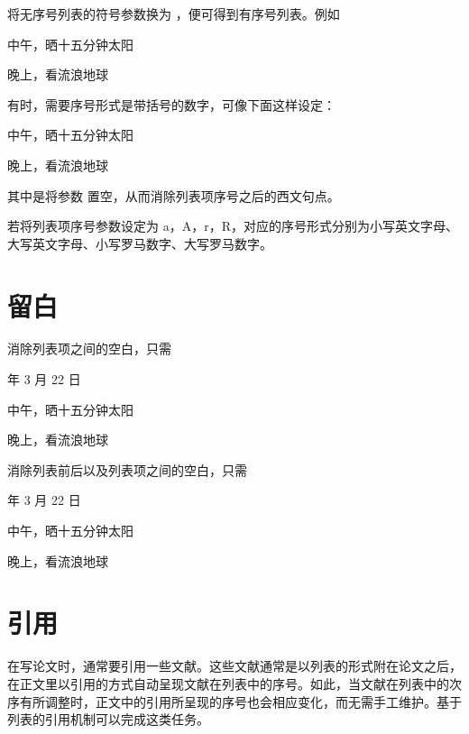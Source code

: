 将无序号列表的符号参数换为 ，便可得到有序号列表。例如

\startexample
\startitemize[n]
\item 中午，晒十五分钟太阳
\item 晚上，看流浪地球 
\stopitemize
\stopexample
{}

有时，需要序号形式是带括号的数字，可像下面这样设定：

\startexample
\startitemize[n][left=(,right=),stopper=]
\item 中午，晒十五分钟太阳
\item 晚上，看流浪地球 
\stopitemize
\stopexample
{}

\noindent 其中是将参数  置空，从而消除列表项序号之后的西文句点。

若将列表项序号参数设定为 a，A，r，R，对应的序号形式分别为小写英文字母、大写英文字母、小写罗马数字、大写罗马数字。

\section{留白}

消除列表项之间的空白，只需

 年 3 月 22 日
\startitemize[1,packed]
\item 中午，晒十五分钟太阳
\item 晚上，看流浪地球 
\stopitemize
\stopexample
{}

消除列表前后以及列表项之间的空白，只需

 年 3 月 22 日
\startitemize[1,nowhite]
\item 中午，晒十五分钟太阳
\item 晚上，看流浪地球 
\stopitemize
\stopexample
{}

\section[itemcite]{引用}

在写论文时，通常要引用一些文献。这些文献通常是以列表的形式附在论文之后，在正文里以引用的方式自动呈现文献在列表中的序号。如此，当文献在列表中的次序有所调整时，正文中的引用所呈现的序号也会相应变化，而无需手工维护。基于列表的引用机制可以完成这类任务。

